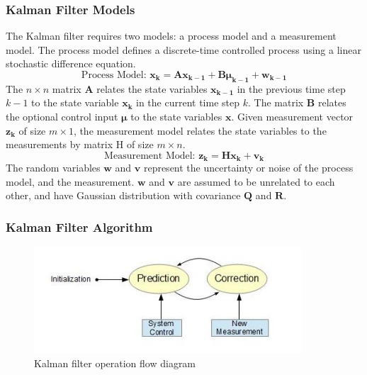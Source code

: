 \subsubsection{Kalman Filter Models}

The Kalman filter requires two models: a process model and a measurement
model. The process model defines a discrete-time controlled process
using a linear stochastic difference equation.
\begin{equation}
\text{Process Model: }
\boldsymbol{x_k} = \boldsymbol{Ax_{k-1}}+
\boldsymbol{B}\boldsymbol{\mu_{k-1}}+\boldsymbol{w_{k-1}}
\end{equation}
\noindent The $n\times n$ matrix $\boldsymbol{A}$ relates the state
variables $\boldsymbol{x_{k-1}}$ in the previous time step $k-1$ to the
state variable $\boldsymbol{x_{k}}$ in the current time step $k$. The
matrix $\boldsymbol{B}$ relates the optional control input $\boldsymbol{\mu}$
to the state variables $\boldsymbol{x}$. Given measurement vector
$\boldsymbol{z_k}$ of size $m \times 1$, the measurement model relates the
state variables to the measurements by matrix H of size $m \times n$.
\begin{equation}
\text{Measurement Model: }\boldsymbol{z_k} = \boldsymbol{Hx_k}+\boldsymbol{v_k}
\end{equation}
The random variables $\boldsymbol{w}$ and $\boldsymbol{v}$ represent the
uncertainty or noise of the process model, and the measurement.
$\boldsymbol{w}$ and $\boldsymbol{v}$ are assumed to be unrelated to each
other, and have Gaussian distribution with covariance $\boldsymbol{Q}$ and $\boldsymbol{R}$.

\subsubsection{Kalman Filter Algorithm}
\begin{figure}[h]
\centering
\includegraphics[width=10cm, keepaspectratio=true]{./Figures/KalmanOperation.jpg}
\caption{Kalman filter operation flow diagram}
\label{figch2:1}
\end{figure}

